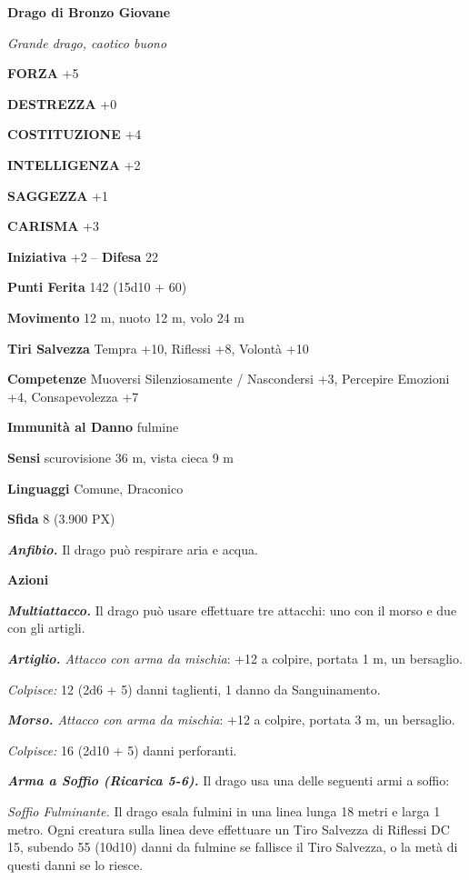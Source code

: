 \begin{multicols}{2}
\medskip{}\textbf{Drago di Bronzo Giovane}

\textit{Grande drago, caotico buono}

\textbf{FORZA} +5

\textbf{DESTREZZA} +0

\textbf{COSTITUZIONE} +4

\textbf{INTELLIGENZA} +2

\textbf{SAGGEZZA} +1

\textbf{CARISMA} +3

\textbf{Iniziativa} +2 -- \textbf{Difesa} 22

\textbf{Punti Ferita} 142 (15d10 + 60)

\textbf{Movimento} 12 m, nuoto 12 m, volo 24 m

\textbf{Tiri Salvezza} Tempra +10, Riflessi +8, Volontà +10

\textbf{Competenze} Muoversi Silenziosamente / Nascondersi +3, Percepire Emozioni +4, Consapevolezza +7

\textbf{Immunità al Danno} fulmine

\textbf{Sensi} scurovisione 36 m, vista cieca 9 m

\textbf{Linguaggi} Comune, Draconico

\textbf{Sfida} 8 (3.900 PX)

\textit{\textbf{Anfibio.}} Il drago può respirare aria e acqua.

\textbf{Azioni}

\textit{\textbf{Multiattacco.}} Il drago può usare effettuare tre attacchi: uno con il morso e due con gli artigli.

\textit{\textbf{Artiglio.} Attacco con arma da mischia}: +12 a colpire, portata 1 m, un bersaglio.

\textit{Colpisce:} 12 (2d6 + 5) danni taglienti, 1 danno da Sanguinamento.

\textit{\textbf{Morso.} Attacco con arma da mischia}: +12 a colpire, portata 3 m, un bersaglio.

\textit{Colpisce:} 16 (2d10 + 5) danni perforanti.

\textit{\textbf{Arma a Soffio (Ricarica 5-6).}} Il drago usa una delle seguenti armi a soffio:

\textit{Soffio Fulminante.} Il drago esala fulmini in una linea lunga 18 metri e larga 1 metro. Ogni creatura sulla linea deve effettuare un Tiro Salvezza di Riflessi DC 15, subendo 55 (10d10) danni da fulmine se fallisce il Tiro Salvezza, o la metà di questi danni se lo riesce.


\end{multicols}
